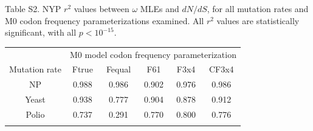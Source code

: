 \documentclass{pnastwo}
\begin{document}
\vspace{2cm}

\noindent Table S2. NYP $r^2$ values between $\omega$ MLEs and $dN/dS$, for all mutation rates and M0 codon frequency parameterizations examined. All $r^2$ values are statistically significant, with all $p < 10^{-15}$.
\begin{table}[htbp]
	\begin{tabular}{c c c c c c}
		\hline\noalign{\smallskip}
		& \multicolumn{5}{c}{M0 model codon frequency parameterization} \\
		\cline{2-6}\noalign{\medskip}
		Mutation rate & Ftrue & Fequal & F61 & F3x4 & CF3x4 \\
		\hline\noalign{\smallskip}
		NP & 0.988 & 0.986 & 0.902 & 0.976 & 0.986 \\
		Yeast & 0.938 & 0.777 & 0.904 & 0.878 & 0.912 \\
		Polio & 0.737 & 0.291 & 0.770 & 0.800 & 0.776 \\
		\noalign{\smallskip}\hline\noalign{\smallskip}
	\end{tabular}
\end{table}	
	
\end{document}
